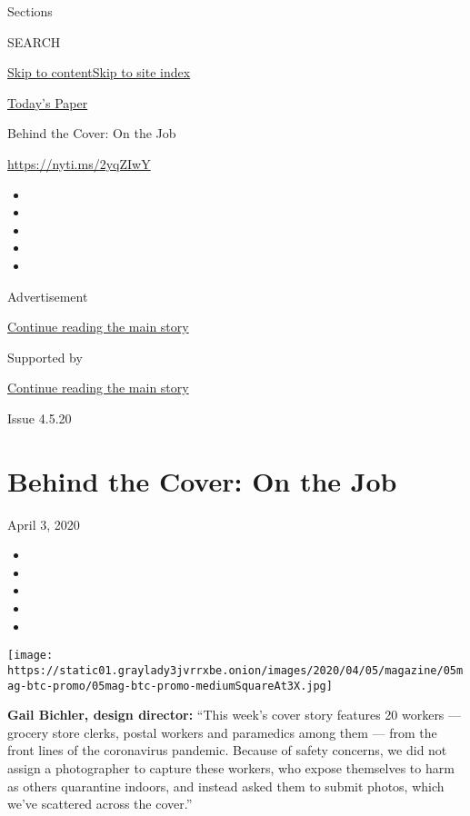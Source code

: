 Sections

SEARCH

\protect\hyperlink{site-content}{Skip to
content}\protect\hyperlink{site-index}{Skip to site index}

\href{https://myaccount.nytimes3xbfgragh.onion/auth/login?response_type=cookie\&client_id=vi}{}

\href{https://www.nytimes3xbfgragh.onion/section/todayspaper}{Today's
Paper}

Behind the Cover: On the Job

\url{https://nyti.ms/2yqZIwY}

\begin{itemize}
\item
\item
\item
\item
\item
\end{itemize}

Advertisement

\protect\hyperlink{after-top}{Continue reading the main story}

Supported by

\protect\hyperlink{after-sponsor}{Continue reading the main story}

Issue 4.5.20

\hypertarget{behind-the-cover-on-the-job}{%
\section{Behind the Cover: On the
Job}\label{behind-the-cover-on-the-job}}

April 3, 2020

\begin{itemize}
\item
\item
\item
\item
\item
\end{itemize}

\texttt{[image: https://static01.graylady3jvrrxbe.onion/images/2020/04/05/magazine/05mag-btc-promo/05mag-btc-promo-mediumSquareAt3X.jpg]}

\textbf{Gail Bichler, design director:} ``This week's cover story
features 20 workers --- grocery store clerks, postal workers and
paramedics among them --- from the front lines of the coronavirus
pandemic. Because of safety concerns, we did not assign a photographer
to capture these workers, who expose themselves to harm as others
quarantine indoors, and instead asked them to submit photos, which we've
scattered across the cover.''

